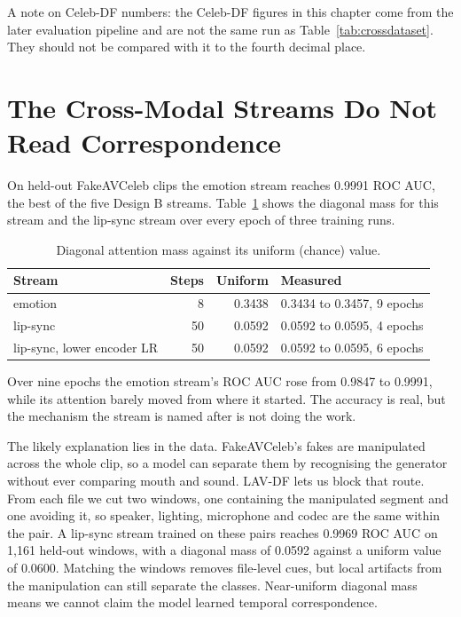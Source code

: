 A note on Celeb-DF numbers: the Celeb-DF figures in this chapter come from the
later evaluation pipeline and are not the same run as
Table~\ref{tab:crossdataset}. They should not be compared with it to the
fourth decimal place.

\section{The Cross-Modal Streams Do Not Read Correspondence}

On held-out FakeAVCeleb clips the emotion stream reaches 0.9991 ROC AUC, the
best of the five Design B streams. Table~\ref{tab:diag} shows the diagonal mass
for this stream and the lip-sync stream over every epoch of three training
runs.

\begin{table}[ht]
    \centering
    \caption{Diagonal attention mass against its uniform (chance) value.}
    \label{tab:diag}
    \begin{tabular}{lrrl}
        \toprule
        \textbf{Stream} & \textbf{Steps} & \textbf{Uniform} & \textbf{Measured} \\
        \midrule
        emotion & 8 & 0.3438 & 0.3434 to 0.3457, 9 epochs \\
        lip-sync & 50 & 0.0592 & 0.0592 to 0.0595, 4 epochs \\
        lip-sync, lower encoder LR & 50 & 0.0592 & 0.0592 to 0.0595, 6 epochs \\
        \bottomrule
    \end{tabular}
\end{table}

Over nine epochs the emotion stream's ROC AUC rose from 0.9847 to 0.9991, while
its attention barely moved from where it started. The accuracy is real, but the
mechanism the stream is named after is not doing the work.

The likely explanation lies in the data. FakeAVCeleb's fakes are manipulated
across the whole clip, so a model can separate them by recognising the
generator without ever comparing mouth and sound. LAV-DF lets us block that
route. From each file we cut two windows, one containing the manipulated
segment and one avoiding it, so speaker, lighting, microphone and codec are the
same within the pair. A lip-sync stream trained on these pairs reaches 0.9969
ROC AUC on 1,161 held-out windows, with a diagonal mass of 0.0592 against a
uniform value of 0.0600. Matching the windows removes file-level cues, but
local artifacts from the manipulation can still separate the classes.
Near-uniform diagonal mass means we cannot claim the model learned temporal
correspondence.

